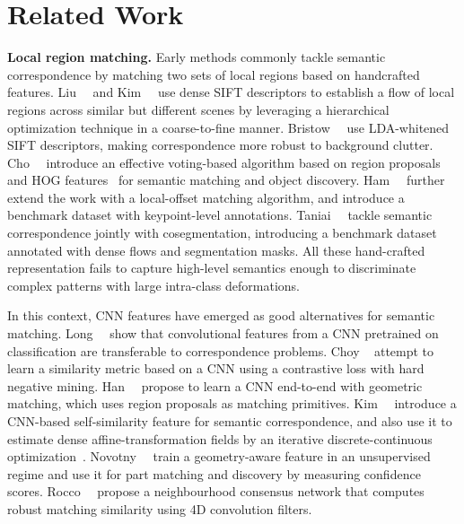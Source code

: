 \documentclass[10pt,twocolumn,letterpaper]{article}
\begin{document}
\section{Related Work}
\smallbreak
\noindent \textbf{Local region matching.}
Early methods commonly tackle semantic correspondence by matching two sets of local regions based on handcrafted features. Liu~\etal~\cite{liu2016sift} and Kim~\etal~\cite{kim2013deformable} use dense SIFT descriptors to establish a flow of local regions across similar but different scenes by leveraging a hierarchical optimization technique in a coarse-to-fine manner. Bristow~\etal~\cite{bristow2015dense} use LDA-whitened SIFT descriptors, making correspondence more robust to background clutter.
Cho~\etal~\cite{cho2015unsupervised} introduce an effective voting-based algorithm based on region proposals and HOG features~\cite{dalal2005histograms} for semantic matching and object discovery. Ham~\etal~\cite{ham2016proposal} further extend the work with a local-offset matching algorithm, and introduce a benchmark dataset with keypoint-level annotations. Taniai~\etal~\cite{taniai2016joint} tackle semantic correspondence jointly with cosegmentation, introducing a benchmark dataset annotated with dense flows and segmentation masks. 
All these hand-crafted representation fails to capture high-level semantics enough to discriminate complex patterns with large intra-class deformations. 

In this context, CNN features have emerged as good alternatives for semantic matching.
Long~\etal~\cite{long2014convnets} show that convolutional features from a CNN pretrained on classification are transferable to correspondence problems. 
Choy \etal~\cite{choy2016universal} attempt to learn a similarity metric based on a CNN using a contrastive loss with hard negative mining. Han~\etal~\cite{han2017scnet} propose to learn a CNN end-to-end with geometric matching, which uses region proposals as matching primitives. Kim~\etal~\cite{kim2017fcss} introduce a CNN-based self-similarity feature for semantic correspondence, and also use it to estimate dense affine-transformation fields by an iterative discrete-continuous optimization~\cite{kim2017dctm}.
Novotny~\etal~\cite{novotny2018self} train a geometry-aware feature in an unsupervised regime and use it for part matching and discovery by measuring confidence scores.
Rocco~\etal~\cite{rocco2018neighbourhood} propose a neighbourhood consensus network that computes robust matching similarity using 4D convolution filters.
\end{document}
